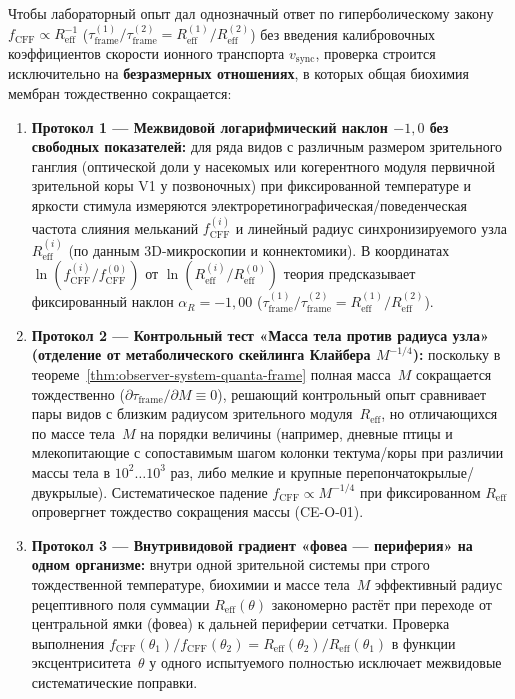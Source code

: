 Чтобы лабораторный опыт дал однозначный ответ по гиперболическому закону $f_{\mathrm{CFF}} \propto R_{\mathrm{eff}}^{-1}$ ($\tau_{\mathrm{frame}}^{(1)}/\tau_{\mathrm{frame}}^{(2)} = R_{\mathrm{eff}}^{(1)}/R_{\mathrm{eff}}^{(2)}$) без введения калибровочных коэффициентов скорости ионного транспорта $v_{\mathrm{sync}}$, проверка строится исключительно на \textbf{безразмерных отношениях}, в которых общая биохимия мембран тождественно сокращается:
\begin{enumerate}[leftmargin=*]
\item \textbf{Протокол 1 --- Межвидовой логарифмический наклон $-1{,}0$ без свободных показателей:}
  для ряда видов с различным размером зрительного ганглия (оптической доли у насекомых или когерентного модуля первичной зрительной коры V1 у позвоночных) при фиксированной температуре и яркости стимула измеряются электроретинографическая/поведенческая частота слияния мельканий $f_{\mathrm{CFF}}^{(i)}$ и линейный радиус синхронизируемого узла $R_{\mathrm{eff}}^{(i)}$ (по данным 3D-микроскопии и коннектомики). В координатах $\ln(f_{\mathrm{CFF}}^{(i)}/f_{\mathrm{CFF}}^{(0)})$ от $\ln(R_{\mathrm{eff}}^{(i)}/R_{\mathrm{eff}}^{(0)})$ теория предсказывает фиксированный наклон $\alpha_R = -1{,}00$ ($\tau_{\mathrm{frame}}^{(1)}/\tau_{\mathrm{frame}}^{(2)} = R_{\mathrm{eff}}^{(1)}/R_{\mathrm{eff}}^{(2)}$).
\item \textbf{Протокол 2 --- Контрольный тест «Масса тела против радиуса узла» (отделение от метаболического скейлинга Клайбера $M^{-1/4}$):}
  поскольку в теореме~\ref{thm:observer-system-quanta-frame} полная масса~$M$ сокращается тождественно ($\partial\tau_{\mathrm{frame}}/\partial M \equiv 0$), решающий контрольный опыт сравнивает пары видов с близким радиусом зрительного модуля~$R_{\mathrm{eff}}$, но отличающихся по массе тела~$M$ на порядки величины (например, дневные птицы и млекопитающие с сопоставимым шагом колонки тектума/коры при различии массы тела в $10^2\ldots 10^3$ раз, либо мелкие и крупные перепончатокрылые/двукрылые). Систематическое падение $f_{\mathrm{CFF}} \propto M^{-1/4}$ при фиксированном $R_{\mathrm{eff}}$ опровергнет тождество сокращения массы (CE-O-01).
\item \textbf{Протокол 3 --- Внутривидовой градиент «фовеа --- периферия» на одном организме:}
  внутри одной зрительной системы при строго тождественной температуре, биохимии и массе тела~$M$ эффективный радиус рецептивного поля суммации $R_{\mathrm{eff}}(\theta)$ закономерно растёт при переходе от центральной ямки (фовеа) к дальней периферии сетчатки. Проверка выполнения $f_{\mathrm{CFF}}(\theta_1)/f_{\mathrm{CFF}}(\theta_2) = R_{\mathrm{eff}}(\theta_2)/R_{\mathrm{eff}}(\theta_1)$ в функции эксцентриситета~$\theta$ у одного испытуемого полностью исключает межвидовые систематические поправки.
\end{enumerate}
